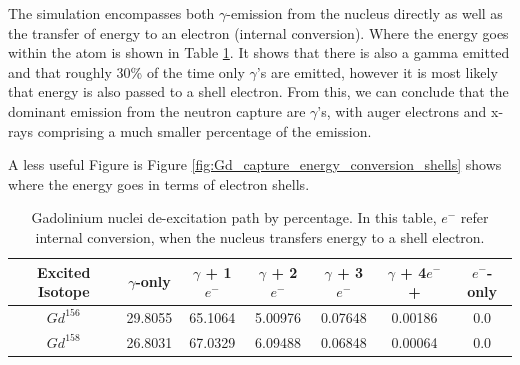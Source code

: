 \par
The simulation encompasses both $\gamma$-emission from the nucleus directly as well as the transfer of energy to an electron (internal conversion).
Where the energy goes within the atom is shown in Table \ref{tab:Gd_internal_energy_conversion}.
It shows that there is also a gamma emitted and that roughly 30\% of the time only $\gamma$'s are emitted, however it is most likely that energy is also passed to a shell electron.
From this, we can conclude that the dominant emission from the neutron capture are $\gamma$'s, with auger electrons and x-rays comprising a much smaller percentage of the emission.
\par
A less useful Figure is Figure \ref{fig:Gd_capture_energy_conversion_shells} shows where the energy goes in terms of electron shells. 

\begin{table}[!htbp]
    \centering
    \begin{tabular}{c | c | c | c | c | c | c}
    \hline
    {Excited Isotope}  & {$\gamma$-only} & {$\gamma$ + 1$e^{-}$} & {$\gamma$ + 2$e^{-}$} & {$\gamma$ + 3$e^{-}$} & {$\gamma$ + 4$e^{-}$+} & {$e^{-}$-only}\\ \hline
    $Gd^{156}$         & 29.8055         & 65.1064               & 5.00976               & 0.07648               & 0.00186               & 0.0        \\
    $Gd^{158}$         & 26.8031         & 67.0329               & 6.09488               & 0.06848               & 0.00064               & 0.0
     
    \end{tabular}
    \caption{Gadolinium nuclei de-excitation path by percentage. In this table, $e^{-}$ refer internal conversion, when the nucleus transfers energy to a shell electron.}
    \label{tab:Gd_internal_energy_conversion}
\end{table} 

